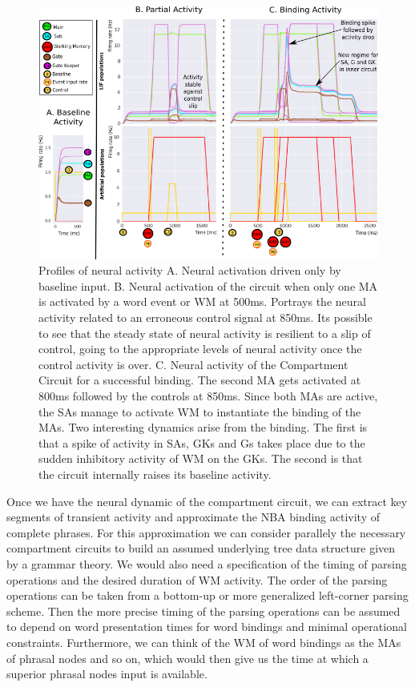 \documentclass[10pt]{article}
\begin{document}
\begin{figure}[h!]
\begin{center}
\includegraphics[width=0.70\columnwidth]{figures/activity_profiles/activity_profiles}
\caption{{\label{activity_profiles} Profiles of neural activity
A. Neural activation driven only by baseline input. B. Neural activation
of the circuit when only one MA is activated by a word event or WM at
500ms. Portrays the neural activity related to an erroneous control
signal at 850ms. Its possible to see that the steady state of neural
activity is resilient to a slip of control, going to the appropriate
levels of neural activity once the control activity is over. C. Neural
activity of the Compartment Circuit for a successful binding. The second
MA gets activated at 800ms followed by the controls at 850ms. Since both
MAs are active, the SAs manage to activate WM to instantiate the binding
of the MAs. Two interesting dynamics arise from the binding. The first
is that a spike of activity in SAs, GKs and Gs takes place due to the
sudden inhibitory activity of WM on the GKs. The second is that the
circuit internally raises its baseline activity.%
}}
\end{center}
\end{figure}

Once we have the neural dynamic of the compartment circuit, we can
extract key segments of transient activity and approximate the NBA
binding activity of complete phrases. For this approximation we can
consider parallely the necessary compartment circuits to build an
assumed underlying tree data structure given by a grammar theory. We
would also need a specification of the timing of parsing operations and
the desired duration of WM activity. The order of the parsing operations
can be taken from a bottom-up or more generalized left-corner parsing
scheme. Then the more precise timing of the parsing operations can be
assumed to depend on word presentation times for word bindings and
minimal operational constraints. Furthermore, we can think of the WM of
word bindings as the MAs of phrasal nodes and so on, which would then
give us the time at which a superior phrasal nodes input is available.
\end{document}
